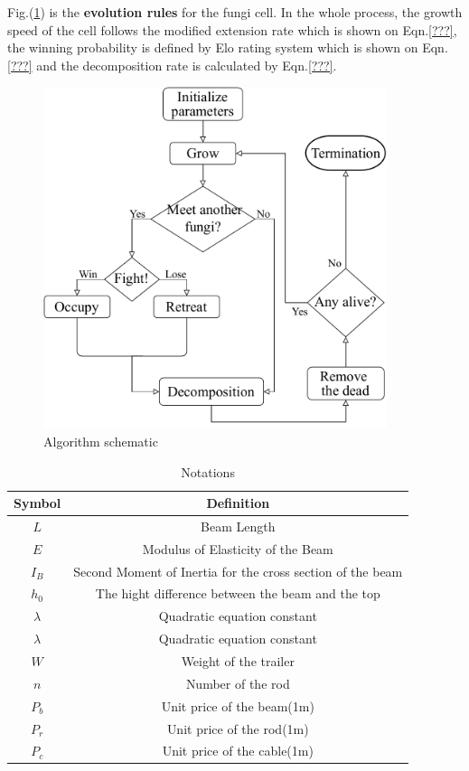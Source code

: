 \documentclass{mcmthesis}
\begin{document}
\par Fig.(\ref{AS}) is the \textbf{evolution rules} for the fungi cell. In the whole process, the growth speed of the cell follows the modified extension rate which is shown on Eqn.\eqref{???}, the winning probability is defined by Elo rating system which is shown on Eqn.\eqref{???} and the decomposition rate is calculated by Eqn.\eqref{???}.
\begin{figure}[H] 
	\centering 
	\includegraphics[height=10cm]{./picture/liucheng.pdf}
	\caption{Algorithm schematic}
	\label{AS}
\end{figure}
\par 

\begin{table}[H]
	\centering
	\caption{Notations}
	\begin{tabular}{c|c}
	\hline
	Symbol & Definition \\
	\hline
	$L$ & Beam Length\\
	$E$ &  Modulus of Elasticity of the Beam\\
	$I_B$ & Second Moment of Inertia for the cross section of the beam\\
	$h_0$ & The hight difference between the beam and the top\\
	$\lambda$ & Quadratic equation constant\\
	$\lambda$ & Quadratic equation constant\\
	$W$ & Weight of the trailer\\
	$n$ & Number of the rod\\
	$P_b$ & Unit price of the beam(1m)\\
	$P_r$ & Unit price of the rod(1m)\\
	$P_c$ & Unit price of the cable(1m) \\
	\hline
	\end{tabular}
\end{table}
\end{document}
